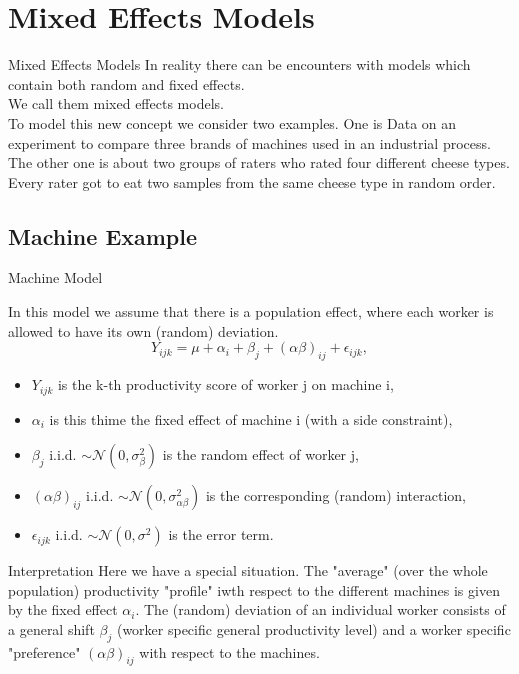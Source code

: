 \documentclass[unknownkeysallowed]{beamer}
\begin{document}
\section{Mixed Effects Models}
\begin{frame}{Mixed Effects Models}
	In reality there can be encounters with models which contain both random and fixed effects. \\ We call them mixed effects models.\\
	To model this new concept we consider two examples. One is Data on an experiment to compare three brands of machines used in an industrial process. The other one is about two groups of raters who rated four different cheese types. Every rater got to eat two samples from the same cheese type in random order.
\end{frame}
\subsection{Machine Example}
\begin{frame}{Machine Model}
	
	In this model we assume that there is a population effect, where each worker is allowed to have its own (random) deviation.
	\begin{equation*}
		Y_{ijk} = \mu + \alpha_i + \beta_j + (\alpha \beta)_{ij} + \epsilon_{ijk},
	\end{equation*}
	
	\begin{itemize}
		\item $Y_{ijk}$ is the k-th productivity score of worker j on machine i,
		\item $\alpha_i$ is this thime the fixed effect of machine i (with a side constraint),
		\item $\beta_j$ i.i.d. $\sim \mathcal{N}(0,\sigma^2_{\beta})$ is the random effect of worker j,
		\item $(\alpha \beta)_{ij}$ i.i.d. $\sim \mathcal{N}(0,\sigma^2_{\alpha \beta})$ is the corresponding (random) interaction,
		\item $\epsilon_{ijk}$ i.i.d. $\sim \mathcal{N}(0,\sigma^2)$ is the error term.
	\end{itemize}
	

\end{frame}

\begin{frame}{Interpretation}
	Here we have a special situation. The "average" (over the whole population) productivity "profile" iwth respect to the different machines is given by the fixed effect $\alpha_i$. The (random) deviation of an individual worker consists of a general shift $\beta_j$ (worker specific general productivity level) and a worker specific "preference" $(\alpha \beta)_{ij}$ with respect to the machines.
\end{frame}
\end{document}

